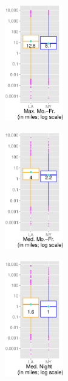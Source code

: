 \begin{figure}[t]
	\centering
	\begin{subfigure}[t]{1in}
		\centering
		\includegraphics[width=1in]{fig/footprints/max_ranges.eps}
	\end{subfigure}
	\begin{subfigure}[t]{1in}
		\centering
    \includegraphics[width=1in]{fig/footprints/med_ranges_day.eps}
	\end{subfigure}
	\begin{subfigure}[t]{1in}
		\centering
    \includegraphics[width=1in]{fig/footprints/med_ranges_night.eps}
	\end{subfigure}
	\vspace{2ex}


\end{figure}
